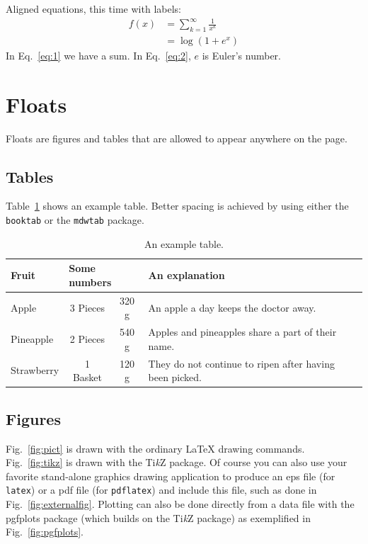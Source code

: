 \documentclass[11pt,a4paper,twoside]{report}
\begin{document}
Aligned equations, this time with labels:
\begin{align}
  \label{eq:1}
  f(x) &= \sum_{k=1}^\infty \frac{1}{x^k}\\
  \label{eq:2}
  &= \log(1+e^x)
\end{align}
In Eq.~\eqref{eq:1} we have a sum.  In Eq.~\eqref{eq:2}, $e$ is Euler's number.

\section{Floats}
Floats are figures and tables that are allowed to appear anywhere on the page.

\subsection{Tables}
Table~\ref{tab:table} shows an example table.  Better spacing is achieved by
using either the \texttt{booktab} or the \texttt{mdwtab} package.

\begin{table}[htb]
  \centering
  \begin{tabular}{@{}lccp{5cm}@{}}
    \textbf{Fruit} & \multicolumn{2}{l}{\textbf{Some numbers}} & \textbf{An
      explanation}\\ \hline\hline
    Apple & 3 Pieces & 320 g & An apple a day keeps the doctor away.\\ \hline
    Pineapple & 2 Pieces & 540 g & Apples and pineapples share a part of their
    name. \\ \hline
    Strawberry & 1 Basket & 120 g & They do not continue to ripen after having
    been picked.\\ \hline 
  \end{tabular}
  \caption{An example table.}
  \label{tab:table}
\end{table}

\subsection{Figures}
Fig.~\ref{fig:pict} is drawn with the ordinary \LaTeX{} drawing commands.
Fig.~\ref{fig:tikz} is drawn with the Ti\emph{k}Z package.  Of course you can
also use your favorite stand-alone graphics drawing application to produce an
eps file (for \texttt{latex}) or a pdf file (for \texttt{pdflatex}) and include
this file, such as done in Fig.~\ref{fig:externalfig}.  Plotting can also be
done directly from a data file with the pgfplots package (which builds on the
Ti\emph{k}Z package) as exemplified in Fig.~\ref{fig:pgfplots}.
\end{document}
